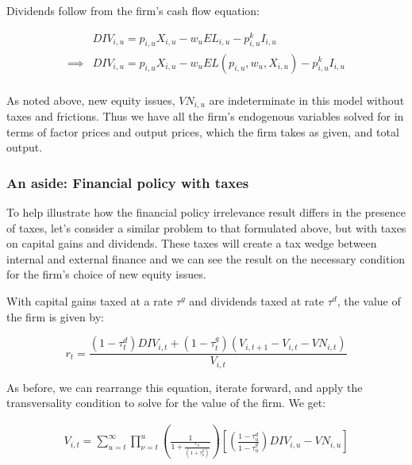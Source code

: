 \documentclass[letterpaper,12pt]{article}
\theoremstyle{definition}
\begin{document}
\begin{spacing}{1.5}
Dividends follow from the firm's cash flow equation:

\begin{equation}
\label{eqn:solve_dyn_div}
\begin{split}
 &DIV_{i,u} = p_{i,u}X_{i,u} - w_{u}EL_{i,u}-p^{k}_{i,u}I_{i,u} \\
\implies &DIV_{i,u} = p_{i,u}X_{i,u} - w_{u}EL(p_{i,u},w_{u},X_{i,u}) - p^{k}_{i,u}I_{i,u} \\
\end{split}
\end{equation}

As noted above, new equity issues, $VN_{i,u}$ are indeterminate in this model without taxes and frictions.  Thus we have all the firm's endogenous variables solved for in terms of factor prices and output prices, which the firm takes as given, and total output.

\subsubsection*{An aside: Financial policy with taxes}
To help illustrate how the financial policy irrelevance result differs in the presence of taxes, let's consider a similar problem to that formulated above, but with taxes on capital gains and dividends.  These taxes will create a tax wedge between internal and external finance and we can see the result on the necessary condition for the firm's choice of new equity issues.

With capital gains taxed at a rate $\tau^{g}$ and dividends taxed at rate $\tau^{d}$, the value of the firm is given by:


\begin{equation}
r_{t} = \frac{(1-\tau^{d}_{t})DIV_{i,t}+(1-\tau^{g}_{t})(V_{i,t+1}-V_{i,t}-VN_{i,t})}{V_{i,t}}
\end{equation} 

As before, we can rearrange this equation, iterate forward, and apply the transversality condition to solve for the value of the firm.  We get:

\begin{equation}
\label{eqn:v_firm_tax}
\begin{split}
 V_{i,t}= \sum_{u=t}^{\infty} \prod_{\nu=t}^{u}\left(\frac{1}{1+\frac{r_{\nu}}{(1+\tau^{g}_{\nu})}}\right)\left[ \left(\frac{1-\tau^{d}_{u}}{1-\tau^{g}_{u}}\right)DIV_{i,u}-VN_{i,u} \right] \\
\end{split}
\end{equation}


\end{spacing}
\end{document}
